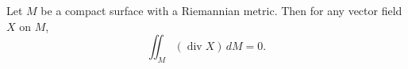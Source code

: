 Let $M$ be a compact surface with a Riemannian metric. Then for any vector field $X$ on $M$,
$$\iint_M (\operatorname{div} X) \, dM = 0.$$